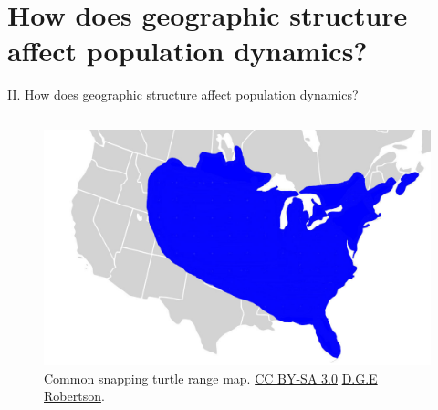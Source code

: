 \section{How does geographic structure affect population dynamics?}


\begin{frame}[t]

    \begin{adjustwidth}{-2em}{-1.5em}

    \vspace{-3mm}
    II. How does geographic structure affect population dynamics? \\


    \vspace{-3mm}
    \begin{columns}


        \begin{figure}
            \includegraphics[width=1.1\textwidth]{../images/snapping-turtle-range-cc-by-sa-30-DGE-Robertson.png}
            \caption{Common snapping turtle range map.
                {\tiny
                \href{http://creativecommons.org/licenses/by-sa/3.0/}{CC BY-SA 3.0}
                \href{http://upload.wikimedia.org/wikipedia/commons/f/f9/Common_snapping_turtle_range_map.jpg}{D.G.E Robertson}.}
            }
        \end{figure}


\end{columns}
\end{adjustwidth}
\end{frame}
